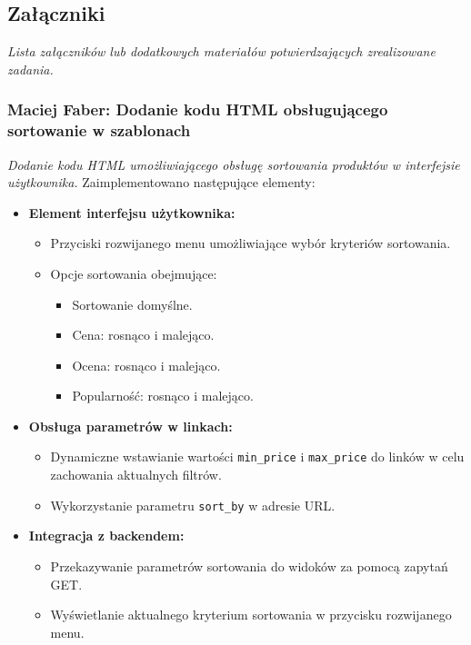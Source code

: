 \documentclass[12pt,a4paper,oneside]{article}
\theoremstyle{definition}
\numberwithin{equation}{section}
\begin{document}
\subsection{Załączniki}
\textit{Lista załączników lub dodatkowych materiałów potwierdzających zrealizowane zadania.}
%
%
\subsubsection{Maciej Faber: Dodanie kodu HTML obsługującego sortowanie w szablonach}
\label{section:1.3.46}
\textit{
Dodanie kodu HTML umożliwiającego obsługę sortowania produktów w interfejsie użytkownika.
}
Zaimplementowano następujące elementy:
\begin{itemize}
    \item \textbf{Element interfejsu użytkownika:}
    \begin{itemize}
        \item Przyciski rozwijanego menu umożliwiające wybór kryteriów sortowania.
        \item Opcje sortowania obejmujące:
        \begin{itemize}
            \item Sortowanie domyślne.
            \item Cena: rosnąco i malejąco.
            \item Ocena: rosnąco i malejąco.
            \item Popularność: rosnąco i malejąco.
        \end{itemize}
    \end{itemize}
    \item \textbf{Obsługa parametrów w linkach:}
    \begin{itemize}
        \item Dynamiczne wstawianie wartości \texttt{min\_price} i \texttt{max\_price} do linków w celu zachowania aktualnych filtrów.
        \item Wykorzystanie parametru \texttt{sort\_by} w adresie URL.
    \end{itemize}
    \item \textbf{Integracja z backendem:}
    \begin{itemize}
        \item Przekazywanie parametrów sortowania do widoków za pomocą zapytań GET.
        \item Wyświetlanie aktualnego kryterium sortowania w przycisku rozwijanego menu.
    \end{itemize}
\end{itemize}
\end{document}
